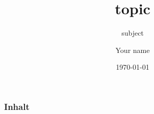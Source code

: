 \documentclass{beamer}
\title{topic}
\subtitle{subject}
\author[Y. name]{Your name}
\institute
{
  Your institute\\
}
\date[\today]{\today}
\begin{document}
\frame[plain]{\titlepage}

\begin{frame}
  \frametitle{Inhalt}
 \tableofcontents
\end{frame}
\end{document}
